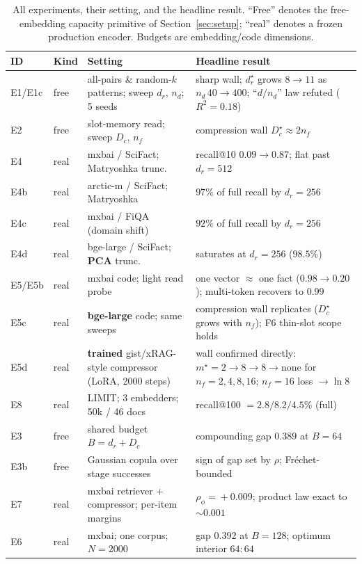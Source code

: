 \documentclass{article}
\newcommand{\dr}{d_r}
\begin{document}
\begin{table}[h]
\caption{All experiments, their setting, and the headline result. ``Free'' denotes the
free-embedding capacity primitive of Section~\ref{sec:setup}; ``real'' denotes a frozen production
encoder. Budgets are embedding/code dimensions.}
\label{tab:exps}
\centering\small
\begin{tabular}{@{}llp{4.4cm}p{4.6cm}@{}}
\toprule
ID & Kind & Setting & Headline result\\
\midrule
E1/E1c & free & all-pairs \& random-$k$ patterns; sweep $\dr$, $n_d$; 5 seeds & sharp wall; $\dr^\star$ grows $8\!\to\!11$ as $n_d\,40\!\to\!400$; ``$d/n_d$'' law refuted ($R^2{=}0.18$)\\
E2 & free & slot-memory read; sweep $D_c$, $n_f$ & compression wall $D_c^\star\!\approx\!2n_f$\\
E4 & real & mxbai / SciFact; Matryoshka trunc.\ & recall@10 $0.09\!\to\!0.87$; flat past $\dr{=}512$\\
E4b & real & arctic-m / SciFact; Matryoshka & $97\%$ of full recall by $\dr{=}256$\\
E4c & real & mxbai / FiQA (domain shift) & $92\%$ of full recall by $\dr{=}256$\\
E4d & real & bge-large / SciFact; \textbf{PCA} trunc.\ & saturates at $\dr{=}256$ ($98.5\%$)\\
E5/E5b & real & mxbai code; light read probe & one vector $\approx$ one fact ($0.98\!\to\!0.20$); multi-token recovers to $0.99$\\
E5c & real & \textbf{bge-large} code; same sweeps & compression wall replicates ($D_c^\star$ grows with $n_f$); F6 thin-slot scope holds\\
E5d & real & \textbf{trained} gist/xRAG-style compressor (LoRA, 2000 steps) & wall confirmed directly: $m^\star{=}2{\to}8{\to}8{\to}$none for $n_f{=}2,4,8,16$; $n_f{=}16$ loss $\to\ln 8$\\
E8 & real & LIMIT; 3 embedders; 50k / 46 docs & recall@100 $=2.8/8.2/4.5\%$ (full)\\
E3 & free & shared budget $B{=}\dr{+}D_c$ & compounding gap $0.389$ at $B{=}64$\\
E3b & free & Gaussian copula over stage successes & sign of gap set by $\rho$; Fr\'echet-bounded\\
E7 & real & mxbai retriever + compressor; per-item margins & $\rho_\phi\!=\!+0.009$; product law exact to $\sim\!0.001$\\
E6 & real & mxbai; one corpus; $N{=}2000$ & gap $0.392$ at $B{=}128$; optimum interior $64{:}64$\\

\end{tabular}
\end{table}
\end{document}

